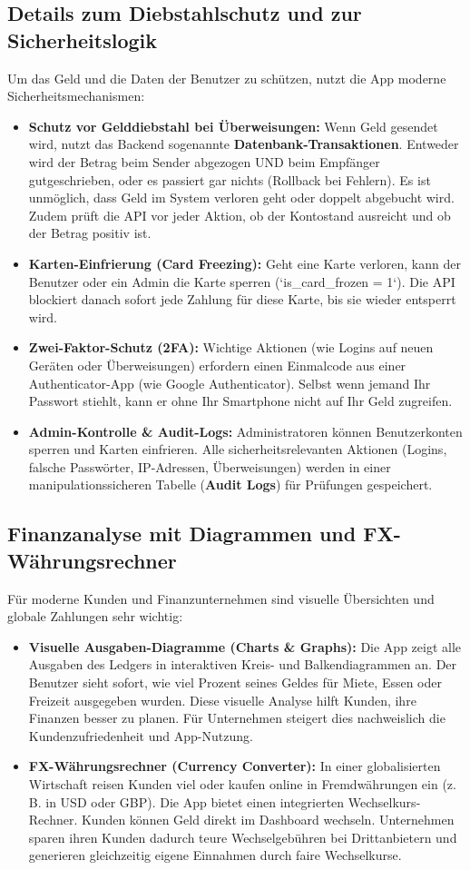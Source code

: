 \documentclass[11pt,a4paper]{article}
\begin{document}
\subsection{Details zum Diebstahlschutz und zur Sicherheitslogik}
Um das Geld und die Daten der Benutzer zu schützen, nutzt die App moderne Sicherheitsmechanismen:
\begin{itemize}
    \item \textbf{Schutz vor Gelddiebstahl bei Überweisungen:} Wenn Geld gesendet wird, nutzt das Backend sogenannte \textbf{Datenbank-Transaktionen}. Entweder wird der Betrag beim Sender abgezogen UND beim Empfänger gutgeschrieben, oder es passiert gar nichts (Rollback bei Fehlern). Es ist unmöglich, dass Geld im System verloren geht oder doppelt abgebucht wird. Zudem prüft die API vor jeder Aktion, ob der Kontostand ausreicht und ob der Betrag positiv ist.
    \item \textbf{Karten-Einfrierung (Card Freezing):} Geht eine Karte verloren, kann der Benutzer oder ein Admin die Karte sperren (`is_card_frozen = 1`). Die API blockiert danach sofort jede Zahlung für diese Karte, bis sie wieder entsperrt wird.
    \item \textbf{Zwei-Faktor-Schutz (2FA):} Wichtige Aktionen (wie Logins auf neuen Geräten oder Überweisungen) erfordern einen Einmalcode aus einer Authenticator-App (wie Google Authenticator). Selbst wenn jemand Ihr Passwort stiehlt, kann er ohne Ihr Smartphone nicht auf Ihr Geld zugreifen.
    \item \textbf{Admin-Kontrolle \& Audit-Logs:} Administratoren können Benutzerkonten sperren und Karten einfrieren. Alle sicherheitsrelevanten Aktionen (Logins, falsche Passwörter, IP-Adressen, Überweisungen) werden in einer manipulationssicheren Tabelle (\textbf{Audit Logs}) für Prüfungen gespeichert.
\end{itemize}

\subsection{Finanzanalyse mit Diagrammen und FX-Währungsrechner}
Für moderne Kunden und Finanzunternehmen sind visuelle Übersichten und globale Zahlungen sehr wichtig:
\begin{itemize}
    \item \textbf{Visuelle Ausgaben-Diagramme (Charts \& Graphs):} Die App zeigt alle Ausgaben des Ledgers in interaktiven Kreis- und Balkendiagrammen an. Der Benutzer sieht sofort, wie viel Prozent seines Geldes für Miete, Essen oder Freizeit ausgegeben wurden. Diese visuelle Analyse hilft Kunden, ihre Finanzen besser zu planen. Für Unternehmen steigert dies nachweislich die Kundenzufriedenheit und App-Nutzung.
    \item \textbf{FX-Währungsrechner (Currency Converter):} In einer globalisierten Wirtschaft reisen Kunden viel oder kaufen online in Fremdwährungen ein (z. B. in USD oder GBP). Die App bietet einen integrierten Wechselkurs-Rechner. Kunden können Geld direkt im Dashboard wechseln. Unternehmen sparen ihren Kunden dadurch teure Wechselgebühren bei Drittanbietern und generieren gleichzeitig eigene Einnahmen durch faire Wechselkurse.
\end{itemize}
\end{document}
